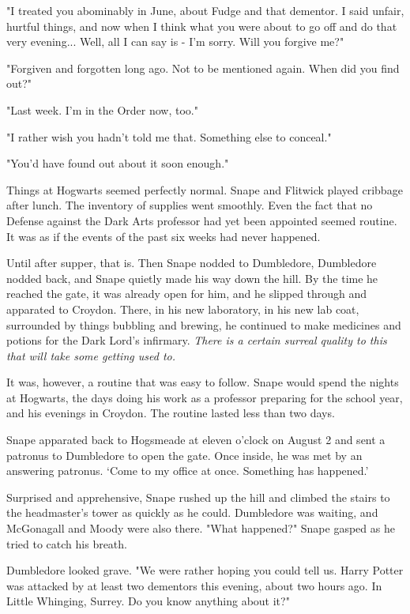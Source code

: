\documentclass[a4paper,11pt]{article}
\begin{document}
"I treated you abominably in June, about Fudge and that dementor. I said unfair, hurtful things, and now when I think what you were about to go off and do that very evening... Well, all I can say is - I'm sorry. Will you forgive me?"

"Forgiven and forgotten long ago. Not to be mentioned again. When did you find out?"

"Last week. I'm in the Order now, too."

"I rather wish you hadn't told me that. Something else to conceal."

"You'd have found out about it soon enough."

Things at Hogwarts seemed perfectly normal. Snape and Flitwick played cribbage after lunch. The inventory of supplies went smoothly. Even the fact that no Defense against the Dark Arts professor had yet been appointed seemed routine. It was as if the events of the past six weeks had never happened.

Until after supper, that is. Then Snape nodded to Dumbledore, Dumbledore nodded back, and Snape quietly made his way down the hill. By the time he reached the gate, it was already open for him, and he slipped through and apparated to Croydon. There, in his new laboratory, in his new lab coat, surrounded by things bubbling and brewing, he continued to make medicines and potions for the Dark Lord's infirmary. \emph{There is a certain surreal quality to this that will take some getting used to.}

It was, however, a routine that was easy to follow. Snape would spend the nights at Hogwarts, the days doing his work as a professor preparing for the school year, and his evenings in Croydon. The routine lasted less than two days.

Snape apparated back to Hogsmeade at eleven o'clock on August 2 and sent a patronus to Dumbledore to open the gate. Once inside, he was met by an answering patronus. `Come to my office at once. Something has happened.'

Surprised and apprehensive, Snape rushed up the hill and climbed the stairs to the headmaster's tower as quickly as he could. Dumbledore was waiting, and McGonagall and Moody were also there. "What happened?" Snape gasped as he tried to catch his breath.

Dumbledore looked grave. "We were rather hoping you could tell us. Harry Potter was attacked by at least two dementors this evening, about two hours ago. In Little Whinging, Surrey. Do you know anything about it?"
\end{document}
